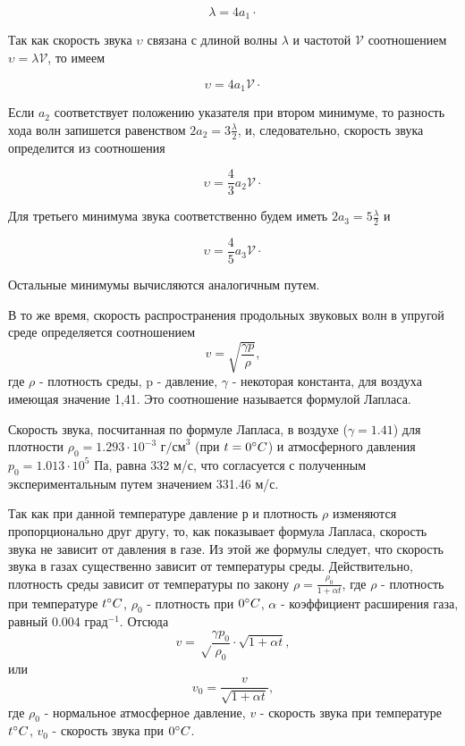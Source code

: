 \documentclass[12pt]{article}
\begin{document}
\begin{equation}
    \lambda = 4a_1\cdot
\end{equation}

Так как скорость звука $\upsilon$ связана с длиной волны $\lambda$  и частотой $\mathcal{V}$ соотношением $\upsilon = \lambda \mathcal{V}$, то имеем 

\begin{equation}
    \upsilon = 4a_1 \mathcal{V} \cdot
\end{equation}

Если $a_2$ соответствует положению указателя при втором минимуме, то разность хода волн запишется равенством $2a_2 = 3 \frac{\lambda}{2}$, и, следовательно, скорость звука определится из соотношения 

\begin{equation}
    \upsilon = \frac{4}{3} a_2 \mathcal{V} \cdot
\end{equation}

Для третьего минимума звука соответственно будем иметь $2a_3 = 5 \frac{\lambda}{2}$ и

\begin{equation}
    \upsilon = \frac{4}{5} a_3 \mathcal{V} \cdot
\end{equation}

Остальные минимумы вычисляются аналогичным путем.

В то же время, скорость распространения продольных звуковых волн в упругой среде определяется соотношением 
\begin{equation}
    v = \sqrt{\frac{\gamma p}{\rho}},
\end{equation}
где $\rho$ - плотность среды, p - давление, $\gamma$ - некоторая константа, для воздуха имеющая значение 1,41. Это соотношение называется формулой Лапласа.

Скорость звука, посчитанная по формуле Лапласа, в воздухе ($\gamma = 1.41$) для плотности $\rho_0 = 1.293 \cdot 10^{-3}$ $\text{г/см}^3$ (при $t = 0 \degree C$) и атмосферного давления $p_0 = 1.013 \cdot 10^5$ Па, равна 332 м/с, что согласуется с полученным экспериментальным путем значением 331.46 м/с. 

Так как при данной температуре  давление р и плотность $\rho$ изменяются пропорционально друг другу, то, как показывает формула Лапласа, скорость звука не зависит от давления в газе. Из этой же формулы следует, что скорость звука в газах существенно зависит от температуры среды. Действительно, плотность среды зависит от температуры по закону $\rho = \frac{\rho_0}{1+\alpha t}$, где $\rho$ - плотность при температуре $t \degree C$, $\rho_0$ - плотность при $0 \degree C$, $\alpha$ - коэффициент расширения газа, равный 0.004 $\text{град}^{-1}$. Отсюда
\begin{equation}
    v = \sqrt\frac{\gamma p_0}{\rho_0}\cdot\sqrt{1+\alpha t}, 
\end{equation} 
или
\begin{equation}
    v_0 = \frac{v}{\sqrt{1+\alpha t}},
\end{equation}
где $\rho_0$ - нормальное атмосферное давление, $v$ - скорость звука при температуре $t \degree C$, $v_0$ - скорость звука при $0 \degree C$.
\end{document}
